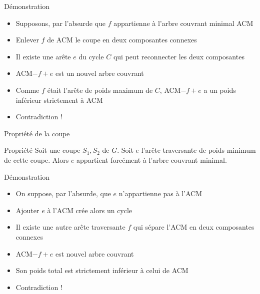 \begin{frame}{Démonstration}

    \begin{itemize}
        \item Supposons, par l'absurde que $f$ appartienne à l'arbre couvrant minimal ACM
        \item Enlever $f$ de ACM le coupe en deux composantes connexes 
        \item Il existe une arête $e$ du cycle $C$ qui peut reconnecter les deux composantes 
        \item ACM$-{f}+{e}$ est un nouvel arbre couvrant 
        \item Comme $f$ était l'arête de poids maximum de $C$, ACM$-{f}+{e}$ a un poids inférieur strictement à ACM
        \item Contradiction !
    \end{itemize}
    
\end{frame}

\begin{frame}{Propriété de la coupe}
    
    \begin{block}{Propriété}
        Soit une coupe $S_1,S_2$ de $G$. Soit $e$ l'arête traversante de poids minimum de cette coupe. Alors $e$ appartient forcément à l'arbre couvrant minimal. 
    \end{block}
\end{frame}

\begin{frame}{Démonstration}
    \begin{itemize}
        \item On suppose, par l'absurde, que $e$ n'appartienne pas à l'ACM 
        \item Ajouter $e$ à l'ACM crée alors un cycle 
        \item Il existe une autre arête traversante $f$ qui sépare l'ACM en deux composantes connexes 
        \item ACM$-{f}+{e}$ est nouvel arbre couvrant 
        \item Son poids total est strictement inférieur à celui de ACM 
        \item Contradiction !
    \end{itemize}
\end{frame}


